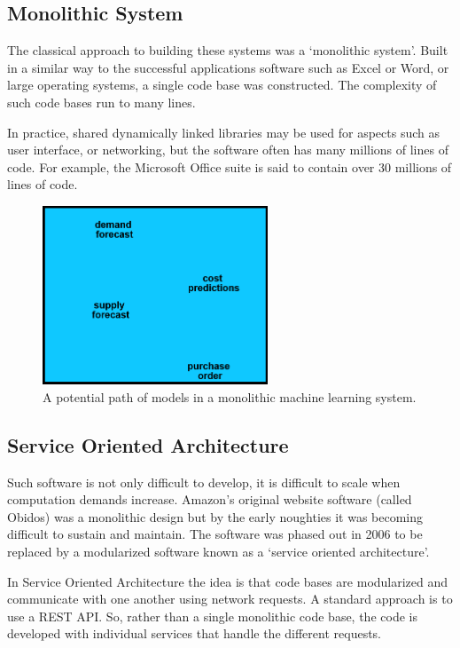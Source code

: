 \documentclass[a4paper]{caesar_book}
\begin{document}
\subsection{Monolithic System}

The classical approach to building these systems was a ‘monolithic system’. Built in a similar way to the successful applications software such as Excel or Word, or large operating systems, a single code base was constructed. The complexity of such code bases run to many lines.

In practice, shared dynamically linked libraries may be used for aspects such as user interface, or networking, but the software often has many millions of lines of code. For example, the Microsoft Office suite is said to contain over 30 millions of lines of code.

\begin{figure}[htbp]%
	\includegraphics[width=0.6\textwidth,keepaspectratio]{pictures/buying_2.PNG}%
	\caption*{A potential path of models in a monolithic machine learning system.}%
\end{figure}%

\subsection{Service Oriented Architecture}

Such software is not only difficult to develop, it is difficult to scale when computation demands increase. Amazon’s original website software (called Obidos) was a monolithic design but by the early noughties it was becoming difficult to sustain and maintain. The software was phased out in 2006 to be replaced by a modularized software known as a ‘service oriented architecture’.

In Service Oriented Architecture the idea is that code bases are modularized and communicate with one another using network requests. A standard approach is to use a REST API. So, rather than a single monolithic code base, the code is developed with individual services that handle the different requests.
\end{document}
